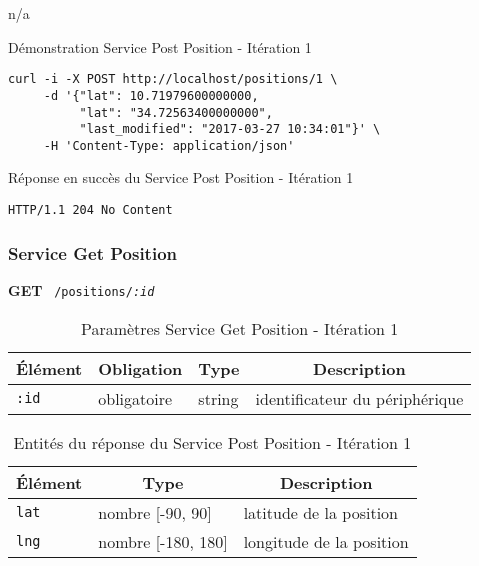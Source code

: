 n/a

\begin{listing}
    \caption{Démonstration Service Post Position - Itération 1}
    \begin{verbatim}
curl -i -X POST http://localhost/positions/1 \
     -d '{"lat": 10.71979600000000,
          "lat": "34.72563400000000",
          "last_modified": "2017-03-27 10:34:01"}' \
     -H 'Content-Type: application/json'
\end{verbatim}
\end{listing}

\begin{listing}[htbp]
    \caption{Réponse en succès du Service Post Position - Itération 1}
\begin{verbatim}
HTTP/1.1 204 No Content
\end{verbatim}
\end{listing}

\subsubsection{Service Get Position}
\label{appendix:sprint1-position-get-doc}

\textbf{GET} \ \texttt{/positions/\textit{:id}}

\begin{table}[htbp]
    \centering
    \caption{Paramètres Service Get Position - Itération 1}
    \begin{tabular}{|l | l | l | l|}
        \hline
        \multicolumn{1}{|c|}{\textbf{Élément}} &
        \multicolumn{1}{c|}{\textbf{Obligation}} &
        \multicolumn{1}{c|}{\textbf{Type}} &
        \multicolumn{1}{c|}{\textbf{Description}} \\ \hline
        \verb|:id| & obligatoire & string & identificateur du périphérique \\ \hline
    \end{tabular}
\end{table}

\begin{table}[htbp]
    \centering
    \caption{Entités du réponse du Service Post Position - Itération 1}
    \begin{tabular}{|l | l | l|}
        \hline
        \multicolumn{1}{|c|}{\textbf{Élément}} &
        \multicolumn{1}{c|}{\textbf{Type}} &
        \multicolumn{1}{c|}{\textbf{Description}} \\ \hline
        \verb|lat| & nombre [-90, 90] & latitude de la position \\ \hline
        \verb|lng| & nombre [-180, 180] & longitude de la position \\ \hline
    \end{tabular}
\end{table}

